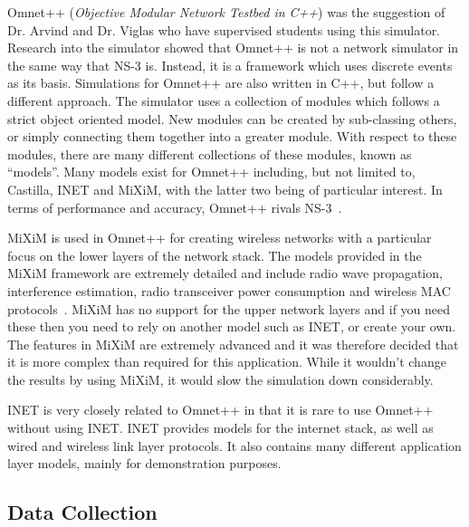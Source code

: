             Omnet++ (\emph{Objective Modular Network Testbed in C++}) was the suggestion of Dr. Arvind and Dr. Viglas who have supervised students using this simulator. Research into the simulator showed that Omnet++ is not a network simulator in the same way that NS-3 is. Instead, it is a framework which uses discrete events as its basis. Simulations for Omnet++ are also written in C++, but follow a different approach. The simulator uses a collection of modules which follows a strict object oriented model. New modules can be created by sub-classing others, or simply connecting them together into a greater module. With respect to these modules, there are many different collections of these modules, known as ``models''. Many models exist for Omnet++ including, but not limited to, Castilla, INET and MiXiM, with the latter two being of particular interest. In terms of performance and accuracy, Omnet++ rivals NS-3~\cite{networksimulatorcomparison}.

            MiXiM is used in Omnet++ for creating wireless networks with a particular focus on the lower layers of the network stack. The models provided in the MiXiM framework are extremely detailed and include radio wave propagation, interference estimation, radio transceiver power consumption and wireless MAC protocols~\cite{miximvision}. MiXiM has no support for the upper network layers and if you need these then you need to rely on another model such as INET, or create your own. The features in MiXiM are extremely advanced and it was therefore decided that it is more complex than required for this application. While it wouldn't change the results by using MiXiM, it would slow the simulation down considerably.

            INET is very closely related to Omnet++ in that it is rare to use Omnet++ without using INET. INET provides models for the internet stack, as well as wired and wireless link layer protocols. It also contains many different application layer models, mainly for demonstration purposes.  


        \subsection{Data Collection}\label{simulation_simulator_options_data_collection}


